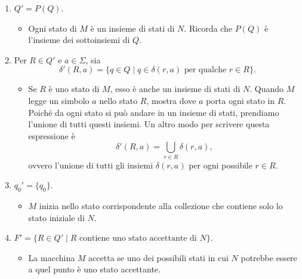\documentclass{article}
\begin{document}
    \begin{enumerate}
        \item $Q' = P(Q)$.
            \begin{itemize}
                \item Ogni stato di $M$ è un insieme di stati di $N$. Ricorda che $P(Q)$ è l'insieme dei sottoinsiemi di $Q$.
            \end{itemize}
        
        \item Per $R \in Q'$ e $a \in \Sigma$, sia 
        \[
            \delta'(R, a) = \{q \in Q \mid q \in \delta(r, a) \text{ per qualche } r \in R\}.
        \]
            \begin{itemize}
                \item Se $R$ è uno stato di $M$, esso è anche un insieme di stati di $N$. Quando $M$ legge un simbolo $a$ nello stato $R$, mostra dove $a$ porta ogni stato in $R$. Poiché da ogni stato si può andare in un insieme di stati, prendiamo l'unione di tutti questi insiemi. Un altro modo per scrivere questa espressione è 
                \[
                    \delta'(R, a) = \bigcup_{r \in R} \delta(r, a),
                \]
                ovvero l'unione di tutti gli insiemi $\delta(r, a)$ per ogni possibile $r \in R$.
            \end{itemize}
        
        \item $q_0' = \{q_0\}$.
            \begin{itemize}
                \item $M$ inizia nello stato corrispondente alla collezione che contiene solo lo stato iniziale di $N$.
            \end{itemize}
        
        \item $F' = \{R \in Q' \mid R \text{ contiene uno stato accettante di } N\}$.
            \begin{itemize}
                \item La macchina $M$ accetta se uno dei possibili stati in cui $N$ potrebbe essere a quel punto è uno stato accettante.
            \end{itemize}
    \end{enumerate}
    
\end{document}
